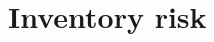 \documentclass[english,10pt
,aspectratio=169
]{beamer}
\begin{document}
%
%
%
%



\section{Inventory risk}
\end{document}
